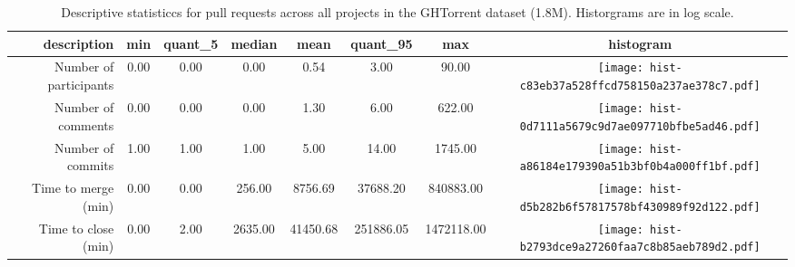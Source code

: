 \begin{table*}[ht]
\centering
\begin{tabular}{rccccccc}
  \hline
description & min & quant\_5 & median & mean & quant\_95 & max & histogram \\ 
  \hline
Number of participants & 0.00 & 0.00 & 0.00 & 0.54 & 3.00 & 90.00 & \texttt{[image: hist-c83eb37a528ffcd758150a237ae378c7.pdf]} \\ 
  Number of comments & 0.00 & 0.00 & 0.00 & 1.30 & 6.00 & 622.00 & \texttt{[image: hist-0d7111a5679c9d7ae097710bfbe5ad46.pdf]} \\ 
  Number of commits & 1.00 & 1.00 & 1.00 & 5.00 & 14.00 & 1745.00 & \texttt{[image: hist-a86184e179390a51b3bf0b4a000ff1bf.pdf]} \\ 
  Time to merge (min) & 0.00 & 0.00 & 256.00 & 8756.69 & 37688.20 & 840883.00 & \texttt{[image: hist-d5b282b6f57817578bf430989f92d122.pdf]} \\ 
  Time to close (min) & 0.00 & 2.00 & 2635.00 & 41450.68 & 251886.05 & 1472118.00 & \texttt{[image: hist-b2793dce9a27260faa7c8b85aeb789d2.pdf]} \\ 
   \hline
\end{tabular}
\caption{Descriptive statisticcs for pull requests across all projects in the GHTorrent dataset (1.8M). Historgrams are in log scale.} 
\label{tab.overall.stats}
\end{table*}
